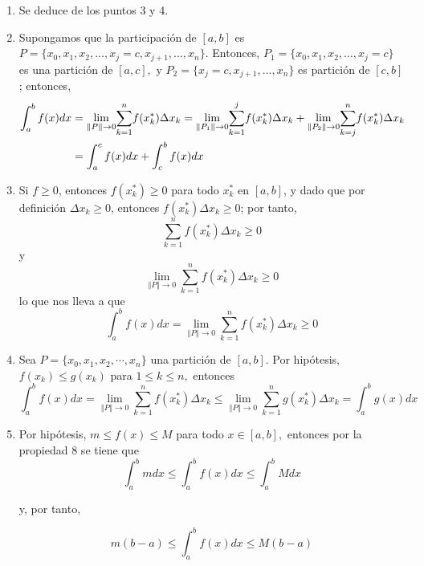 \begin{enumerate}[leftmargin=1.2em,   itemindent=0pt,       labelwidth=\labelwidth,labelsep=0.5em,]
\item Se deduce de los puntos 3 y 4.

\item Supongamos que la participación de $[a,b]$ es $P=\{x_{0},x_{1},x_{2},\ldots, x_{j}=c,x_{j+1},\ldots ,x_{n}\}$. Entonces, $P_{1}=\{x_{0},x_{1},x_{2},\ldots, x_{j}=c\}$ es una partición de $[a,c],$ y \newline$P_{2}=\{x_{j}=c,x_{j+1},\ldots ,x_{n}\}$ es partición de $[c,b]$; entonces,
{\footnotesize
\begin{align*}
\int_{a}^{b}f(x)dx&=\underset{\left\Vert P\right\Vert \rightarrow 0}{\lim }\overset{n}{\underset{k=1}{\sum }}f(x_{k}^{\ast })\Delta x_{k}%
=\underset{\left\Vert P_{1}\right\Vert \rightarrow 0}{
\lim }\overset{j}{\underset{k=1}{\sum }}f(x_{k}^{\ast })\Delta x_{k}+%
\underset{\left\Vert P_{2}\right\Vert \rightarrow 0}{\lim }\overset{n}{%
\underset{k=j}{\sum }}f(x_{k}^{\ast })\Delta x_{k}\\
&=\int_{a}^{c}f(x)dx+\int_{c}^{b}f(x)dx
\end{align*}
}

\item Si $f\geq 0$, entonces $f(x_k^*)\geq 0$ para todo $x_k^*$ en $[a,b]$, y dado que por definición $\Delta x_{k}\geq 0$, entonces $f(x_k^*) \Delta x_{k}\geq 0$; por tanto,
{\small
\[
\overset{n}{\underset{k=1}{\sum }}f(x_{k}^{\ast })\Delta x_{k}\geq 0
\]
}
y
{\small
\[
\underset{\left\Vert P\right\Vert \rightarrow 0}{\lim }%
\overset{n}{\underset{k=1}{\sum }}f(x_{k}^{\ast })\Delta x_{k}\geq 0
\]
}
lo que nos lleva a que
{\small
\[
\int_{a}^{b}f(x)dx=\underset{\left\Vert P\right\Vert \rightarrow 0}{\lim }
\overset{n}{\underset{k=1}{\sum }}f(x_{k}^{\ast })\Delta x_{k}\geq 0
\]
}

\item Sea $P=\{x_{0},x_{1},x_{2},\cdots ,x_{n}\}$ una partición de $[a,b]$. Por hipótesis, $f\left( x_{k}\right) \leq g\left( x_{k}\right)$ para $1\leq k\leq n,$ entonces
{\small
\[
\int_{a}^{b}f(x)dx=\underset{\left\Vert P\right\Vert \rightarrow 0}{\lim }
\overset{n}{\underset{k=1}{\sum }}f(x_{k}^{\ast })\Delta x_{k}\leq
\underset{\left\Vert P\right\Vert \rightarrow 0}{\lim }\overset{n}{\underset{
k=1}{\sum }}g(x_{k}^{\ast })\Delta x_{k}=\int_{a}^{b}g(x)dx
\]
}

\item Por hipótesis, $m\leq f(x)\leq M$ para todo $x\in [a,b],$ entonces por la propiedad $8$ se tiene que
\[
\int_{a}^{b}mdx\leq \int_{a}^{b}f(x)dx\leq \int_{a}^{b}Mdx
\]

y, por tanto,

\[
m(b-a)\leq \int_{a}^{b}f(x)dx\leq M(b-a)
\]
\end{enumerate}

